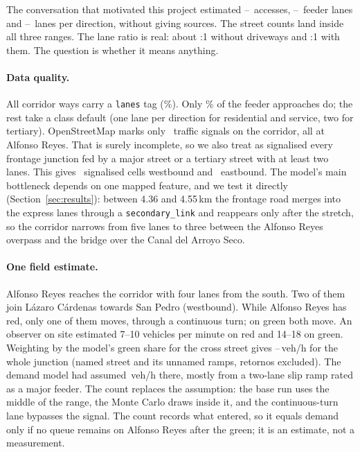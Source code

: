 The conversation that motivated this project estimated
\LLMAccLo--\LLMAccHi\ accesses, \LLMLanesLo--\LLMLanesHi\ feeder lanes and
\LLMMainLo--\LLMMainHi\ lanes per direction, without giving sources. The
street counts land inside all three ranges. The lane ratio is real: about
\InvLaneRatioNoService:1 without driveways and \InvLaneRatio:1 with them.
The question is whether it means anything.

\paragraph{Data quality.} All corridor ways carry a \texttt{lanes} tag
(\InvCorridorTaggedPct\%). Only \InvTaggedPct\% of the feeder approaches
do; the rest take a class default (one lane per direction for
residential and service, two for tertiary). OpenStreetMap marks only
\InvSignalsOSM\ traffic signals on the corridor, all at Alfonso Reyes.
That is surely incomplete, so we also treat as signalised every frontage
junction fed by a major street or a tertiary street with at least two
lanes. This gives \InvSignalsWB\ signalised cells westbound and
\InvSignalsEB\ eastbound. The model's main bottleneck depends on one
mapped feature, and we test it directly (Section~\ref{sec:results}):
between 4.36 and 4.55\,km the frontage road merges into the express lanes
through a \texttt{secondary\_link} and reappears only after the stretch,
so the corridor narrows from five lanes to three between the Alfonso Reyes
overpass and the bridge over the Canal del Arroyo Seco.

\paragraph{One field estimate.} Alfonso Reyes reaches the corridor with
four lanes from the south. Two of them join L\'azaro C\'ardenas towards
San Pedro (westbound). While Alfonso Reyes has red, only one of them moves,
through a continuous turn; on green both move. An observer on site
estimated 7--10 vehicles per minute on red and 14--18 on green. Weighting
by the model's green share for the cross street gives
\FcWBLo--\FcWBHi\,veh/h for the whole junction (named street and its
unnamed ramps, retornos excluded). The demand model had assumed
\FcWBAssumed\,veh/h there, mostly from a two-lane slip ramp rated as a
major feeder. The count replaces the assumption: the base run uses the
middle of the range, the Monte Carlo draws inside it, and the
continuous-turn lane bypasses the signal. The count records what entered,
so it equals demand only if no queue remains on Alfonso Reyes after the
green; it is an estimate, not a measurement.
